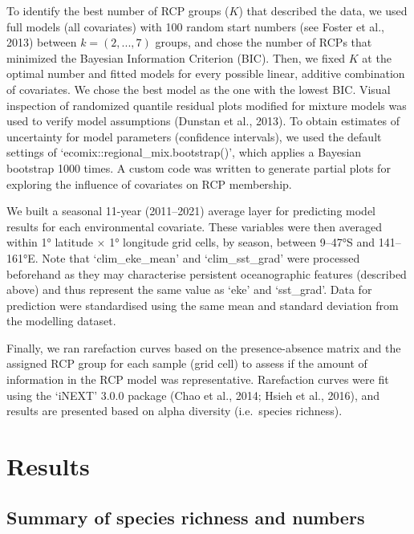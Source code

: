 \documentclass{article}
\begin{document}
To identify the best number of RCP groups (\(K\)) that described the data, we used full models (all covariates) with 100 random start numbers (see Foster et al., 2013) between \(k = (2, ..., 7)\) groups, and chose the number of RCPs that minimized the Bayesian Information Criterion (BIC). Then, we fixed \(K\) at the optimal number and fitted models for every possible linear, additive combination of covariates. We chose the best model as the one with the lowest BIC. Visual inspection of randomized quantile residual plots modified for mixture models was used to verify model assumptions (Dunstan et al., 2013). To obtain estimates of uncertainty for model parameters (confidence intervals), we used the default settings of `ecomix::regional\_mix.bootstrap()', which applies a Bayesian bootstrap 1000 times. A custom code was written to generate partial plots for exploring the influence of covariates on RCP membership.

We built a seasonal 11-year (2011--2021) average layer for predicting model results for each environmental covariate. These variables were then averaged within 1° latitude \(\times\) 1° longitude grid cells, by season, between 9--47°S and 141--161°E. Note that `clim\_eke\_mean' and `clim\_sst\_grad' were processed beforehand as they may characterise persistent oceanographic features (described above) and thus represent the same value as `eke' and `sst\_grad'. Data for prediction were standardised using the same mean and standard deviation from the modelling dataset.

Finally, we ran rarefaction curves based on the presence-absence matrix and the assigned RCP group for each sample (grid cell) to assess if the amount of information in the RCP model was representative. Rarefaction curves were fit using the `iNEXT' 3.0.0 package (Chao et al., 2014; Hsieh et al., 2016), and results are presented based on alpha diversity (i.e.~species richness).

\hypertarget{results}{%
\section{Results}\label{results}}

\hypertarget{summary-of-species-richness-and-numbers}{%
\subsection{Summary of species richness and numbers}\label{summary-of-species-richness-and-numbers}}
\end{document}
